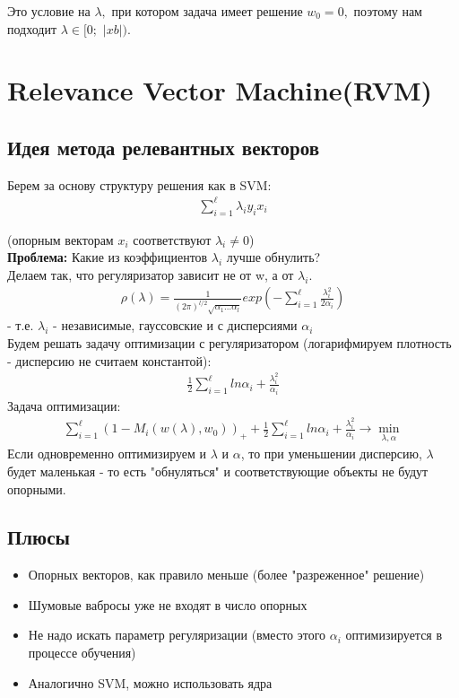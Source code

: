 Это условие на $\lambda,$ при котором задача имеет решение $w_0 = 0,$ поэтому нам подходит $\lambda \in [0;$ $|xb|)$.

\section{Relevance Vector Machine(RVM)}

\subsection{Идея метода релевантных векторов}

Берем за основу структуру решения как в SVM:\\
\begin{align*}
   \sum_{i=1}^{\ell} \lambda_i y_i x_i
\end{align*}

(опорным векторам $x_i$ соответствуют $\lambda_i \neq 0$) \\
\textbf{Проблема:} Какие из коэффициентов $\lambda_i$ лучше обнулить? \\
Делаем так, что регуляризатор зависит не от w, а от $\lambda_i$. \\
\begin{align*}
       \rho (\lambda) = \frac{1}{(2\pi)^{l/2} \sqrt{\alpha_1...\alpha_l}} exp(-\sum_{i=1}^{\ell} \frac{\lambda_i^2}{2\alpha_i})
\end{align*}
- т.е. $\lambda_i$ - независимые, гауссовские и с дисперсиями $\alpha_i$ \\
Будем решать задачу оптимизации с регуляризатором (логарифмируем плотность - дисперсию не считаем константой): \\
\begin{align*}
       \frac{1}{2} \sum_{i=1}^{\ell} ln\alpha_i + \frac{\lambda_i^2}{\alpha_i}
\end{align*} 
Задача оптимизации:  \\
\begin{align*}
       \sum_{i=1}^{\ell} (1 - M_i(w(\lambda), w_0))_+ + \frac{1}{2} \sum_{i=1}^{\ell} ln\alpha_i + \frac{\lambda_i^2}{\alpha_i} \rightarrow \min_{\lambda, \alpha}
\end{align*}
Если одновременно оптимизируем и $\lambda$ и $\alpha$, то при уменьшении дисперсию, $\lambda$ будет маленькая - то есть "обнуляться" и соответствующие объекты не будут опорными. 

\subsection*{Плюсы}
\begin{itemize}
    \item Опорных векторов, как правило меньше (более "разреженное" решение)
    \item Шумовые вабросы уже не входят в число опорных
    \item Не надо искать параметр регуляризации (вместо этого $\alpha_i$ оптимизируется в процессе обучения)
    \item Аналогично SVM, можно использовать ядра
\end{itemize}

